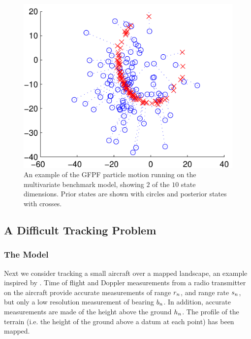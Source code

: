 \documentclass{article}
\begin{document}
\begin{figure}
\centering
\includegraphics[width=0.7\columnwidth]{nlng_example_frame_deter.pdf}
\caption{An example of the GFPF particle motion running on the multivariate benchmark model, showing $2$ of the $10$ state dimensions. Prior states are shown with circles and posterior states with crosses.}
\label{fig:nlng_example_frame}
\end{figure}



\subsection{A Difficult Tracking Problem} \label{sec:numsim:tracking}

\subsubsection{The Model}

Next we consider tracking a small aircraft over a mapped landscape, an example inspired by \cite{Schon2005}. Time of flight and Doppler measurements from a radio transmitter on the aircraft provide accurate measurements of range $r_{n}$, and range rate $s_{n}$, but only a low resolution measurement of bearing $b_{n}$. In addition, accurate measurements are made of the height above the ground $h_{n}$. The profile of the terrain (i.e. the height of the ground above a datum at each point) has been mapped.
\end{document}
